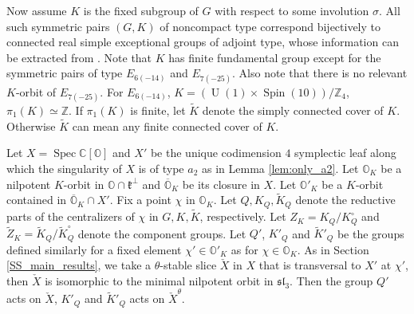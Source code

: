 \documentclass[12pt]{amsart}
\newcommand{\C}{\mathbb{C}}
\newcommand{\g}{\mathfrak{g}}
\newcommand{\Orb}{\mathbb{O}}
\newcommand{\Z}{\mathbb{Z}}
\newcommand{\kf}{\mathfrak{k}}
\newcommand{\SO}{\operatorname{SO}}
\newcommand{\Sp}{\operatorname{Sp}}
\newcommand{\SU}{\operatorname{SU}}
\newcommand{\Spin}{\operatorname{Spin}}
\newcommand{\R}{\mathbb{R}}
\newcommand{\GR}{G_\R}
\newcommand{\KR}{K_\R}
\newcommand{\spec}{\operatorname{Spec}}
\theoremstyle{definition}
\numberwithin{equation}{section}
\begin{document}


Now assume $K$ is the fixed subgroup of $G$ with respect to some involution $\sigma$. All such symmetric pairs $(G,K)$ of noncompact type correspond bijectively to connected real simple exceptional groups of adjoint type, whose information can be extracted from \cite[Table 3]{realgrp}. Note that $K$ has finite fundamental group except for the symmetric pairs of type $E_{6(-14)}$ and $E_{7(-25)}$. Also note that there is no relevant $K$-orbit of $E_{7(-25)}$. For $E_{6(-14)}$, $K=(\operatorname{U}(1)  \times \Spin(10)) / \Z_4$, $\pi_1(K) \simeq \Z$. If $\pi_1(K)$ is finite, let $\tilde{K}$ denote the simply connected cover of $K$. Otherwise $\tilde{K}$ can mean any finite connected cover of $K$. 

Let $X = \spec \C[\Orb]$ and $X'$ be the unique codimension $4$ symplectic leaf along which the singularity of $X$ is of type $a_2$ as in Lemma \ref{lem:only_a2}. Let $\Orb_K$ be a nilpotent $K$-orbit in $\Orb \cap \kf^\perp$ and $\overline{\Orb}_K$ be its closure in $X$. Let $\Orb'_K$ be a $K$-orbit contained in $\overline{\Orb}_K \cap X'$. Fix a point $\chi$ in $\Orb_K$. Let $Q, K_Q, \tilde{K}_Q$ denote the reductive parts of the centralizers of $\chi$ in $G,K,\tilde{K}$,
respectively. Let $Z_K = K_Q / K_Q^\circ$ and $\tilde{Z}_K = \tilde{K}_Q / \tilde{K}_Q^\circ$ denote the component groups. Let $Q'$, $K'_Q$ and $\tilde{K}'_Q$ be the groups defined similarly for a fixed element $\chi' \in \Orb'_K$ as for $\chi \in \Orb_K$. As in Section \ref{SS_main_results}, we take a $\theta$-stable slice $\check{X}$ in $X$ that is transversal to $X'$ at $\chi'$, then $\check{X}$ is isomorphic to the minimal nilpotent orbit in $\mathfrak{sl}_3$. Then the group $Q'$ acts on $\check{X}$, $K'_Q$ and $\tilde{K}'_Q$ acts on $\check{X}^\theta$.
\end{document}
